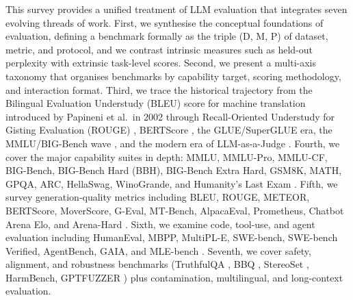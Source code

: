 \documentclass{article}
\begin{document}
This survey provides a unified treatment of LLM evaluation that integrates seven evolving threads of work. First, we synthesise the conceptual foundations of evaluation, defining a benchmark formally as the triple (D, M, P) of dataset, metric, and protocol, and we contrast intrinsic measures such as held-out perplexity with extrinsic task-level scores. Second, we present a multi-axis taxonomy that organises benchmarks by capability target, scoring methodology, and interaction format. Third, we trace the historical trajectory from the Bilingual Evaluation Understudy (BLEU) score for machine translation introduced by Papineni et al.~in 2002 \cite{papineni2002bleuamethodforauto} through Recall-Oriented Understudy for Gisting Evaluation (ROUGE) \cite{lin2004rougeapackageforau}, BERTScore \cite{zhang2020bertscoreevaluatin}, the GLUE/SuperGLUE era, the MMLU/BIG-Bench wave \cite{srivastava20222022}, and the modern era of LLM-as-a-Judge \cite{zheng20232023,liu2023gevalnlgevaluation}. Fourth, we cover the major capability suites in depth: MMLU, MMLU-Pro, MMLU-CF, BIG-Bench, BIG-Bench Hard (BBH), BIG-Bench Extra Hard, GSM8K, MATH, GPQA, ARC, HellaSwag, WinoGrande, and Humanity's Last Exam \cite{phan20252025}. Fifth, we survey generation-quality metrics including BLEU, ROUGE, METEOR, BERTScore, MoverScore, G-Eval, MT-Bench, AlpacaEval, Prometheus, Chatbot Arena Elo, and Arena-Hard \cite{liu2023gevalnlgevaluation,zheng20232023,chiang20242024,li20242024}. Sixth, we examine code, tool-use, and agent evaluation including HumanEval, MBPP, MultiPL-E, SWE-bench, SWE-bench Verified, AgentBench, GAIA, and MLE-bench \cite{chen20212021,austin20212021,cassano20232023,jimenez20242024,liu2023gevalnlgevaluation,mialon2024gaiaabenchmarkforg}. Seventh, we cover safety, alignment, and robustness benchmarks (TruthfulQA \cite{lin2022truthfulqameasurin}, BBQ \cite{parrish20222022}, StereoSet \cite{nadeem2021stereosetmeasuring}, HarmBench, GPTFUZZER \cite{yu2023gptfuzzerredteamin}) plus contamination, multilingual, and long-context evaluation.
\end{document}

